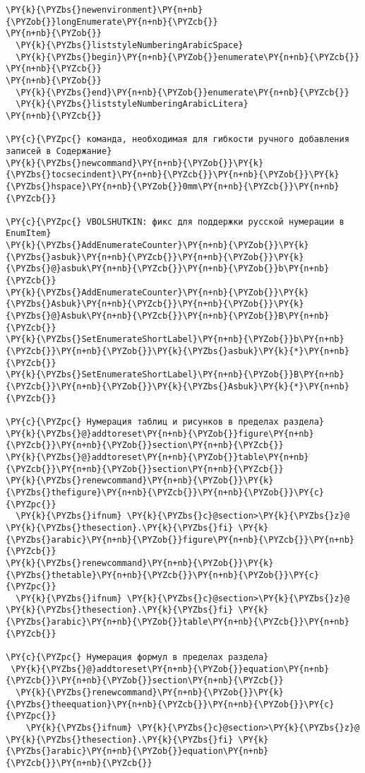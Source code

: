 \begin{Verbatim}[commandchars=\\\{\}]
\PY{k}{\PYZbs{}newenvironment}\PY{n+nb}{\PYZob{}}longEnumerate\PY{n+nb}{\PYZcb{}}
\PY{n+nb}{\PYZob{}} 
  \PY{k}{\PYZbs{}liststyleNumberingArabicSpace}
  \PY{k}{\PYZbs{}begin}\PY{n+nb}{\PYZob{}}enumerate\PY{n+nb}{\PYZcb{}}
\PY{n+nb}{\PYZcb{}} 
\PY{n+nb}{\PYZob{}}
  \PY{k}{\PYZbs{}end}\PY{n+nb}{\PYZob{}}enumerate\PY{n+nb}{\PYZcb{}}
  \PY{k}{\PYZbs{}liststyleNumberingArabicLitera}
\PY{n+nb}{\PYZcb{}}

\PY{c}{\PYZpc{} команда, необходимая для гибкости ручного добавления записей в Содержание}
\PY{k}{\PYZbs{}newcommand}\PY{n+nb}{\PYZob{}}\PY{k}{\PYZbs{}tocsecindent}\PY{n+nb}{\PYZcb{}}\PY{n+nb}{\PYZob{}}\PY{k}{\PYZbs{}hspace}\PY{n+nb}{\PYZob{}}0mm\PY{n+nb}{\PYZcb{}}\PY{n+nb}{\PYZcb{}} 

\PY{c}{\PYZpc{} VBOLSHUTKIN: фикс для поддержки русской нумерации в EnumItem}
\PY{k}{\PYZbs{}AddEnumerateCounter}\PY{n+nb}{\PYZob{}}\PY{k}{\PYZbs{}asbuk}\PY{n+nb}{\PYZcb{}}\PY{n+nb}{\PYZob{}}\PY{k}{\PYZbs{}@}asbuk\PY{n+nb}{\PYZcb{}}\PY{n+nb}{\PYZob{}}b\PY{n+nb}{\PYZcb{}}
\PY{k}{\PYZbs{}AddEnumerateCounter}\PY{n+nb}{\PYZob{}}\PY{k}{\PYZbs{}Asbuk}\PY{n+nb}{\PYZcb{}}\PY{n+nb}{\PYZob{}}\PY{k}{\PYZbs{}@}Asbuk\PY{n+nb}{\PYZcb{}}\PY{n+nb}{\PYZob{}}B\PY{n+nb}{\PYZcb{}}
\PY{k}{\PYZbs{}SetEnumerateShortLabel}\PY{n+nb}{\PYZob{}}b\PY{n+nb}{\PYZcb{}}\PY{n+nb}{\PYZob{}}\PY{k}{\PYZbs{}asbuk}\PY{k}{*}\PY{n+nb}{\PYZcb{}}
\PY{k}{\PYZbs{}SetEnumerateShortLabel}\PY{n+nb}{\PYZob{}}B\PY{n+nb}{\PYZcb{}}\PY{n+nb}{\PYZob{}}\PY{k}{\PYZbs{}Asbuk}\PY{k}{*}\PY{n+nb}{\PYZcb{}}

\PY{c}{\PYZpc{} Нумерация таблиц и рисунков в пределах раздела}
\PY{k}{\PYZbs{}@}addtoreset\PY{n+nb}{\PYZob{}}figure\PY{n+nb}{\PYZcb{}}\PY{n+nb}{\PYZob{}}section\PY{n+nb}{\PYZcb{}}
\PY{k}{\PYZbs{}@}addtoreset\PY{n+nb}{\PYZob{}}table\PY{n+nb}{\PYZcb{}}\PY{n+nb}{\PYZob{}}section\PY{n+nb}{\PYZcb{}}
\PY{k}{\PYZbs{}renewcommand}\PY{n+nb}{\PYZob{}}\PY{k}{\PYZbs{}thefigure}\PY{n+nb}{\PYZcb{}}\PY{n+nb}{\PYZob{}}\PY{c}{\PYZpc{}}
  \PY{k}{\PYZbs{}ifnum} \PY{k}{\PYZbs{}c}@section>\PY{k}{\PYZbs{}z}@ \PY{k}{\PYZbs{}thesection}.\PY{k}{\PYZbs{}fi} \PY{k}{\PYZbs{}arabic}\PY{n+nb}{\PYZob{}}figure\PY{n+nb}{\PYZcb{}}\PY{n+nb}{\PYZcb{}}
\PY{k}{\PYZbs{}renewcommand}\PY{n+nb}{\PYZob{}}\PY{k}{\PYZbs{}thetable}\PY{n+nb}{\PYZcb{}}\PY{n+nb}{\PYZob{}}\PY{c}{\PYZpc{}}
  \PY{k}{\PYZbs{}ifnum} \PY{k}{\PYZbs{}c}@section>\PY{k}{\PYZbs{}z}@ \PY{k}{\PYZbs{}thesection}.\PY{k}{\PYZbs{}fi} \PY{k}{\PYZbs{}arabic}\PY{n+nb}{\PYZob{}}table\PY{n+nb}{\PYZcb{}}\PY{n+nb}{\PYZcb{}}
  
\PY{c}{\PYZpc{} Нумерация формул в пределах раздела}
 \PY{k}{\PYZbs{}@}addtoreset\PY{n+nb}{\PYZob{}}equation\PY{n+nb}{\PYZcb{}}\PY{n+nb}{\PYZob{}}section\PY{n+nb}{\PYZcb{}}
  \PY{k}{\PYZbs{}renewcommand}\PY{n+nb}{\PYZob{}}\PY{k}{\PYZbs{}theequation}\PY{n+nb}{\PYZcb{}}\PY{n+nb}{\PYZob{}}\PY{c}{\PYZpc{}}
    \PY{k}{\PYZbs{}ifnum} \PY{k}{\PYZbs{}c}@section>\PY{k}{\PYZbs{}z}@ \PY{k}{\PYZbs{}thesection}.\PY{k}{\PYZbs{}fi} \PY{k}{\PYZbs{}arabic}\PY{n+nb}{\PYZob{}}equation\PY{n+nb}{\PYZcb{}}\PY{n+nb}{\PYZcb{}}


\end{Verbatim}
